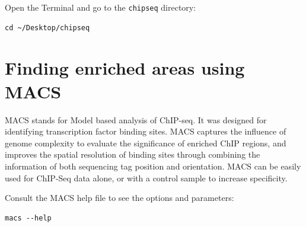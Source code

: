 \begin{steps}
Open the Terminal and go to the \texttt{chipseq} directory:
\begin{lstlisting}
cd ~/Desktop/chipseq
\end{lstlisting}
\end{steps}

\section{Finding enriched areas using MACS}

\begin{information}
MACS stands for Model based analysis of ChIP-seq. It was designed for
identifying transcription factor binding sites. MACS captures the influence of
genome complexity to evaluate the significance of enriched ChIP regions, and
improves the spatial resolution of binding sites through combining the
information of both sequencing tag position and orientation. MACS can be easily
used for ChIP-Seq data alone, or with a control sample to increase specificity.
\end{information}

\begin{steps}
Consult the MACS help file to see the options and parameters:

\begin{lstlisting}
macs --help
\end{lstlisting}
\end{steps}

